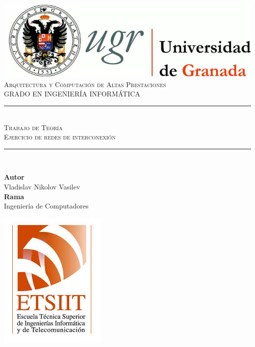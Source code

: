 \documentclass[11pt,a4paper]{article}
\newcommand{\asignatura}{Arquitectura y Computación de Altas Prestaciones}
\newcommand{\autor}{Vladislav Nikolov Vasilev}
\newcommand{\titulo}{Trabajo de Teoría}
\newcommand{\subtitulo}{Ejercicio de redes de interconexión}
\newcommand{\rama}{Ingeniería de Computadores}
\begin{document}

\begin{titlepage}

\begin{minipage}{\textwidth}

\centering

\includegraphics[scale=0.3]{img/logo_ugr.jpg}\\[1cm]

\textsc{\Large \asignatura{}\\[0.2cm]}
\textsc{GRADO EN INGENIERÍA INFORMÁTICA}\\[1cm]

\noindent\rule[-1ex]{\textwidth}{1pt}\\[1.5ex]
\textsc{{\Huge \titulo\\[0.5ex]}}
\textsc{{\Large \subtitulo\\}}
\noindent\rule[-1ex]{\textwidth}{2pt}\\[3.5ex]

\end{minipage}

\vspace{0.7cm}

\begin{minipage}{\textwidth}

\centering

\textbf{Autor}\\ {\autor{}}\\[2.5ex]
\textbf{Rama}\\ {\rama}\\[2.5ex]
\vspace{0.3cm}

\includegraphics[scale=0.3]{img/etsiit.jpeg}


\end{minipage}
\end{titlepage}
\end{document}
